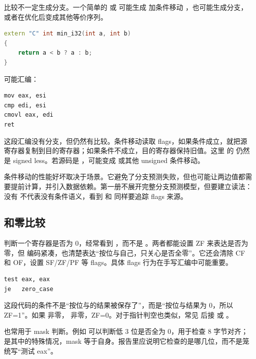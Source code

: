 比较不一定生成分支。一个简单的  或  可能生成  加条件移动 ，也可能生成分支，或者在优化后变成其他等价序列。

\begin{lstlisting}[language=C++]
extern "C" int min_i32(int a, int b)
{
    return a < b ? a : b;
}
\end{lstlisting}

可能汇编：

\begin{lstlisting}
mov eax, esi
cmp edi, esi
cmovl eax, edi
ret
\end{lstlisting}

这段汇编没有分支，但仍然有比较。条件移动读取 flags，如果条件成立，就把源寄存器复制到目的寄存器；如果条件不成立，目的寄存器保持旧值。这里  的  仍然是 signed less。若源码是 ，可能变成  或其他 unsigned 条件移动。

条件移动的性能好坏取决于场景。它避免了分支预测失败，但也可能让两边值都需要提前计算，并引入数据依赖。第一册不展开完整分支预测模型，但要建立读法：没有  不代表没有条件语义，看到  和  同样要追踪 flags 来源。

\subsection{ 和零比较}

判断一个寄存器是否为 0，经常看到 ，而不是 。两者都能设置 ZF 来表达是否为零，但  编码紧凑，也清楚表达“按位与自己，只关心是否全零”。它还会清除 CF 和 OF，设置 SF/ZF/PF 等 flags。具体 flags 行为在手写汇编中可能重要。

\begin{lstlisting}
test eax, eax
je   zero_case
\end{lstlisting}

这段代码的条件不是“按位与的结果被保存了”，而是“按位与结果为 0，所以 ZF=1”。如果  非零， 非零，ZF=0。对于指针判空也类似，常见  后接  或 。

 也常用于 mask 判断。例如  可以判断低 3 位是否全为 0，用于检查 8 字节对齐； 是其中的特殊情况，mask 等于自身。报告里应说明它检查的是哪几位，而不是笼统写“测试 eax”。

